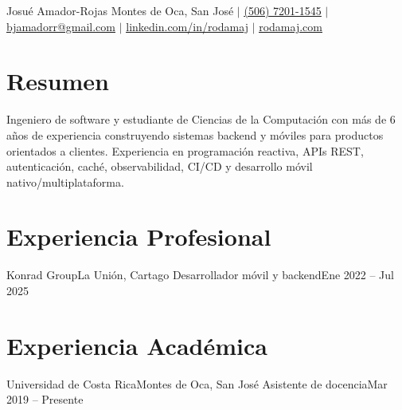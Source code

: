 

\resumeDocumentStart

\resumeHeader
{Josué Amador-Rojas}
{Montes de Oca, San José $|$
  \href{tel:+50672011545}{\underline{(506) 7201-1545}} $|$
  \href{mailto:bjamadorr@gmail.com}{\underline{bjamadorr@gmail.com}} $|$
  \href{https://www.linkedin.com/in/rodamaj}{\underline{linkedin.com/in/rodamaj}} $|$
\href{https://rodamaj.com}{\underline{rodamaj.com}}}

\section{Resumen}
Ingeniero de software y estudiante de Ciencias de la Computación con más de 6 años de experiencia construyendo sistemas backend y móviles para productos orientados a clientes. Experiencia en programación reactiva, APIs REST, autenticación, caché, observabilidad, CI/CD y desarrollo móvil nativo/multiplataforma.

\section{Experiencia Profesional}
\resumeSubHeadingListStart
\resumeSubheading
{Konrad Group}{La Unión, Cartago}
{Desarrollador móvil y backend}{Ene 2022 -- Jul 2025}
\resumeItemListStart
{}
\resumeItemListEnd
\resumeSubHeadingListEnd

\section{Experiencia Académica}
\resumeSubHeadingListStart
\resumeSubheading
{Universidad de Costa Rica}{Montes de Oca, San José}
{Asistente de docencia}{Mar 2019 -- Presente}
\resumeItemListStart
{}
\resumeItemListEnd

